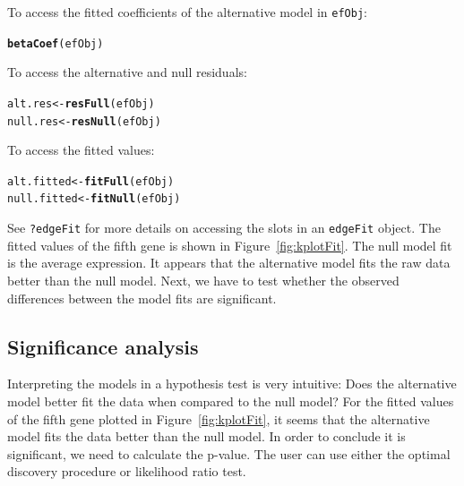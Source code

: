 \documentclass{article}\usepackage[]{graphicx}\usepackage[]{color}
\makeatletter
\newcommand{\hlstd}[1]{\textcolor[rgb]{0.345,0.345,0.345}{#1}}%
\newcommand{\hlkwb}[1]{\textcolor[rgb]{0.69,0.353,0.396}{#1}}%
\newcommand{\hlkwd}[1]{\textcolor[rgb]{0.737,0.353,0.396}{\textbf{#1}}}%
\newenvironment{kframe}{%
 \def\at@end@of@kframe{}%
 \ifinner\ifhmode%
  \def\at@end@of@kframe{\end{minipage}}%
  \begin{minipage}{\columnwidth}%
 \fi\fi%
 \def\FrameCommand##1{\hskip\@totalleftmargin \hskip-\fboxsep
 \colorbox{shadecolor}{##1}\hskip-\fboxsep
     \hskip-\linewidth \hskip-\@totalleftmargin \hskip\columnwidth}%
 \MakeFramed {\advance\hsize-\width
   \@totalleftmargin\z@ \linewidth\hsize
   \@setminipage}}%
 {\par\unskip\endMakeFramed%
 \at@end@of@kframe}
\newenvironment{knitrout}{}{} %
\makeatother
\begin{document}
To access the fitted coefficients of the alternative model in {\tt efObj}:
\begin{knitrout}
\color{fgcolor}\begin{kframe}
\begin{alltt}
\hlkwd{betaCoef}\hlstd{(efObj)}
\end{alltt}
\end{kframe}
\end{knitrout}
To access the alternative and null residuals:
\begin{knitrout}
\color{fgcolor}\begin{kframe}
\begin{alltt}
\hlstd{alt.res} \hlkwb{<-} \hlkwd{resFull}\hlstd{(efObj)}
\hlstd{null.res} \hlkwb{<-} \hlkwd{resNull}\hlstd{(efObj)}
\end{alltt}
\end{kframe}
\end{knitrout}
To access the fitted values:
\begin{knitrout}
\color{fgcolor}\begin{kframe}
\begin{alltt}
\hlstd{alt.fitted} \hlkwb{<-} \hlkwd{fitFull}\hlstd{(efObj)}
\hlstd{null.fitted} \hlkwb{<-} \hlkwd{fitNull}\hlstd{(efObj)}
\end{alltt}
\end{kframe}
\end{knitrout}

See {\tt ?edgeFit} for more details on accessing the slots in an {\tt edgeFit} object. The fitted values of the fifth gene is shown in Figure~\ref{fig:kplotFit}. The null model fit is the average expression. It appears that the alternative model fits the raw data better than the null model. Next, we have to test whether the observed differences between the model fits are significant.

\subsection{Significance analysis}
Interpreting the models in a hypothesis test is very intuitive: Does the alternative model better fit the data when compared to the null model? For the fitted values of the fifth gene plotted in Figure~\ref{fig:kplotFit}, it seems that the alternative model fits the data better than the null model. In order to conclude it is significant, we need to calculate the p-value. The user can use either the optimal discovery procedure or likelihood ratio test. 
\end{document}
